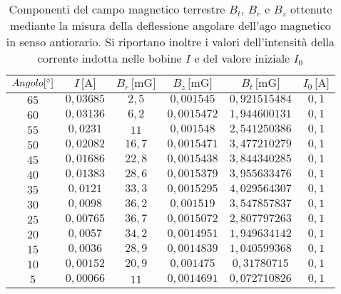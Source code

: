\documentclass[]{article}
\begin{document}
\begin{table}
    \centering

\begin{tabular}{||c|c|c|c|c|c||}
    \hline
    $Angolo [\text{\degree}]$ & $I\, \text{[A]} $ & $B_r\, \text{[mG]} $ & $B_z\, \text{[mG]} $ & $B_t\, \text{[mG]} $ & $I_0\, \text{[A]} $\\
    \hline\hline



    $65$ & $0,03685$ & $2,5 $ & $0,001545 $ & $0,921515484$ & $0,1$ \\\hline
    $60$ & $0,03136$ & $6,2 $ & $0,0015472$ & $1,944600131$ & $0,1$ \\\hline
    $55$ & $0,0231 $ & $11  $ & $0,001548 $ & $2,541250386$ & $0,1$ \\\hline
    $50$ & $0,02082$ & $16,7$ & $0,0015471$ & $3,477210279$ & $0,1$ \\\hline
    $45$ & $0,01686$ & $22,8$ & $0,0015438$ & $3,844340285$ & $0,1$ \\\hline
    $40$ & $0,01383$ & $28,6$ & $0,0015379$ & $3,955633476$ & $0,1$ \\\hline
    $35$ & $0,0121 $ & $33,3$ & $0,0015295$ & $4,029564307$ & $0,1$ \\\hline
    $30$ & $0,0098 $ & $36,2$ & $0,001519 $ & $3,547857837$ & $0,1$ \\\hline
    $25$ & $0,00765$ & $36,7$ & $0,0015072$ & $2,807797263$ & $0,1$ \\\hline
    $20$ & $0,0057 $ & $34,2$ & $0,0014951$ & $1,949634142$ & $0,1$ \\\hline
    $15$ & $0,0036 $ & $28,9$ & $0,0014839$ & $1,040599368$ & $0,1$ \\\hline
    $10$ & $0,00152$ & $20,9$ & $0,001475 $ & $0,31780715 $ & $0,1$ \\\hline
    $5 $ & $0,00066$ & $11  $ & $0,0014691$ & $0,072710826$ & $0,1$ \\\hline

\end{tabular}
\caption{Componenti del campo magnetico terrestre $B_t$, $B_r$ e $B_z$ ottenute mediante la misura della deflessione angolare dell'ago magnetico in senso antiorario. Si riportano inoltre i valori dell'intensità della corrente indotta nelle bobine $I$ e del valore iniziale $I_0$}
\label{campomagneticoterrestre_sensoantiorario}
\end{table}
\end{document}
